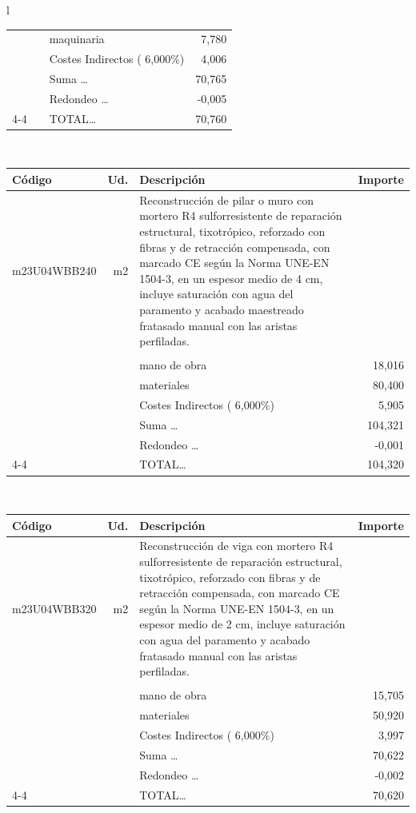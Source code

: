\documentclass{book}%
\begin{document}
\begin{longtable}{l}
\begin{tabular}{l r p{60mm} r}
&&maquinaria&     7,780\\%
&&Costes Indirectos (     6,000\%)&     4,006\\%
&&Suma \ldots&    70,765\\%
&&Redondeo \ldots&    {-}0,005\\%
\cline{4-4}%
&&TOTAL\ldots&    70,760\\%
\end{tabular}\\%
\begin{tabular}{l r p{60mm} r}%
Código&Ud.&Descripción&Importe\\%
\hline%
m23U04WBB240&m2&Reconstrucción de pilar o muro con mortero R4 sulforresistente de reparación estructural, tixotrópico, reforzado con fibras y de retracción compensada, con marcado CE según la Norma UNE{-}EN 1504{-}3, en un espesor medio de 4 cm, incluye saturación con agua del paramento y acabado maestreado fratasado manual con las aristas perfiladas.&\\%
&&&\\%
&&mano de obra&    18,016\\%
&&materiales&    80,400\\%
&&Costes Indirectos (     6,000\%)&     5,905\\%
&&Suma \ldots&   104,321\\%
&&Redondeo \ldots&    {-}0,001\\%
\cline{4-4}%
&&TOTAL\ldots&   104,320\\%
\end{tabular}\\%
\begin{tabular}{l r p{60mm} r}%
Código&Ud.&Descripción&Importe\\%
\hline%
m23U04WBB320&m2&Reconstrucción de viga con mortero R4 sulforresistente de reparación estructural, tixotrópico, reforzado con fibras y de retracción compensada, con marcado CE según la Norma UNE{-}EN 1504{-}3, en un espesor medio de 2 cm, incluye saturación con agua del paramento y acabado fratasado manual con las aristas perfiladas.&\\%
&&&\\%
&&mano de obra&    15,705\\%
&&materiales&    50,920\\%
&&Costes Indirectos (     6,000\%)&     3,997\\%
&&Suma \ldots&    70,622\\%
&&Redondeo \ldots&    {-}0,002\\%
\cline{4-4}%
&&TOTAL\ldots&    70,620\\%

\end{tabular}
\end{longtable}
\end{document}
